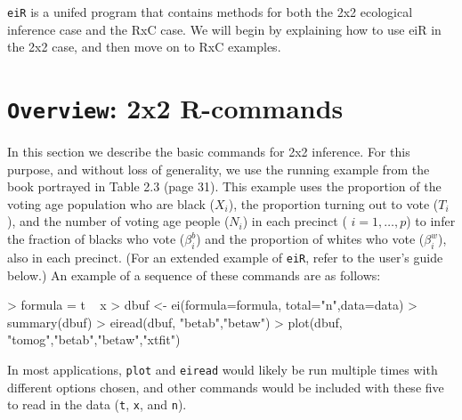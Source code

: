 \documentclass[11pt,oneside,letterpaper,titlepage]{article}
\begin{document}
\noindent \verb#eiR# is a unifed program that contains methods for
both the 2x2 ecological inference case and the RxC case.  We will
begin by explaining how to use eiR in the 2x2 case, and then move on
to RxC examples.

\section[Overview: 2x2 R-commands]{{\tt Overview}: 2x2 R-commands}
\label{commands}

In this section we describe the basic commands for 2x2 inference.  For
this purpose, and without loss of generality, we use the running
example from the book portrayed in Table 2.3 (page 31).  This example
uses the proportion of the voting age population who are black
($X_i$), the proportion turning out to vote ($ T_i$), and the number
of voting age people ($ {N_i}$) in each precinct ( $ i=1,\ldots,p$) to
infer the fraction of blacks who vote ($ \beta_i^b$) and the
proportion of whites who vote ($ \beta_i^w$), also in each precinct.
(For an extended example of \verb#eiR#, refer to the user's guide
below.)  An example of a sequence of these commands are as follows:

\begin{Schunk}
\begin{Sinput}
> formula = t ~ x
> dbuf <- ei(formula=formula, total="n",data=data)
> summary(dbuf)
> eiread(dbuf, "betab","betaw")
> plot(dbuf, "tomog","betab","betaw","xtfit")
\end{Sinput}
\end{Schunk}

\noindent In most applications, \verb#plot# and \verb#eiread# 
would likely be run multiple times with different options chosen, and other commands would 
be included with these five to read in the data (\verb#t#, \verb#x#, and \verb#n#).\\
\newline
 
\end{document}
